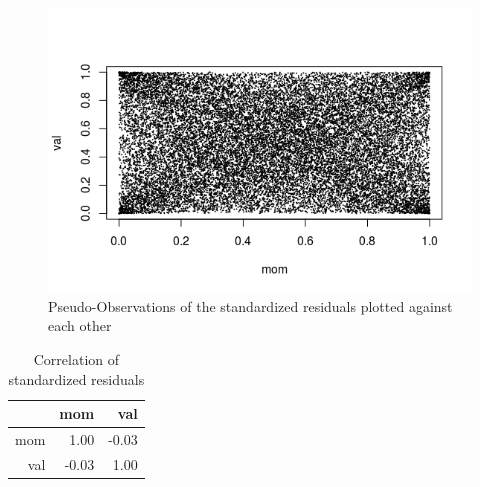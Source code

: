 \documentclass[11pt,letterpaper]{memoir}
\begin{document}
\begin{figure}
\includegraphics[scale=1]{stres}
\caption{Pseudo-Observations of the standardized residuals plotted against each other}
\end{figure}
\begin{table}[ht]
\centering
\caption{Correlation of standardized residuals}
\begin{tabular}{rrr}
  \hline
 & mom & val \\ 
  \hline
mom & 1.00 & -0.03 \\ 
  val & -0.03 & 1.00 \\ 
   \hline
\end{tabular}
\end{table}
\end{document}
